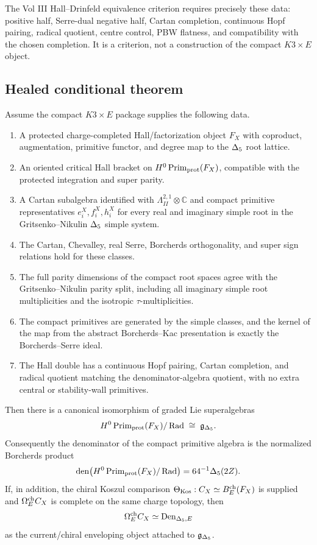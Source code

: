 The Vol III Hall--Drinfeld equivalence criterion requires precisely these
data: positive half, Serre-dual negative half, Cartan completion, continuous
Hopf pairing, radical quotient, centre control, PBW flatness, and
compatibility with the chosen completion.  It is a criterion, not a
construction of the compact \(K3\times E\) object.

\subsection{Healed conditional theorem}

\begin{theorem}
Assume the compact \(K3\times E\) package supplies the following data.
\begin{enumerate}
\item A protected charge-completed Hall/factorization object \(F_X\) with
coproduct, augmentation, primitive functor, and degree map to the
\(\Delta_{5}\) root lattice.
\item An oriented critical Hall bracket on \(H^0\operatorname{Prim}_{\mathrm{prot}}(F_X)\), compatible
with the protected integration and super parity.
\item A Cartan subalgebra identified with
\(\Lambda^{2,1}_{II}\otimes\mathbb C\) and compact primitive representatives
\(e_i^X,f_i^X,h_i^X\) for every real and imaginary simple root in the
Gritsenko--Nikulin \(\Delta_{5}\) simple system.
\item The Cartan, Chevalley, real Serre, Borcherds orthogonality, and super
sign relations hold for these classes.
\item The full parity dimensions of the compact root spaces agree with the
Gritsenko--Nikulin parity split, including all imaginary simple root
multiplicities and the isotropic \(\tau\)-multiplicities.
\item The compact primitives are generated by the simple classes, and the
kernel of the map from the abstract Borcherds--Kac presentation is exactly
the Borcherds--Serre ideal.
\item The Hall double has a continuous Hopf pairing, Cartan completion, and
radical quotient matching the denominator-algebra quotient, with no extra
central or stability-wall primitives.
\end{enumerate}
Then there is a canonical isomorphism of graded Lie superalgebras
\[
   H^0\operatorname{Prim}_{\mathrm{prot}}(F_X)/\operatorname{Rad} \;\cong\; \mathfrak g_{\Delta_{5}} .
\]
Consequently the denominator of the compact primitive algebra is the
normalized Borcherds product
\[
   \operatorname{den}\bigl(H^0\operatorname{Prim}_{\mathrm{prot}}(F_X)/\operatorname{Rad}\bigr)
   =
   64^{-1}\Delta_{5}(2Z).
\]
If, in addition, the chiral Koszul comparison
\(\Theta_{\operatorname{Kos}}:C_X\simeq B^{\operatorname{ch}}_E(F_X)\) is supplied and
\(\Omega^{\operatorname{ch}}_EC_X\) is complete on the same charge topology, then
\[
   \Omega^{\operatorname{ch}}_E C_X\simeq \operatorname{Den}_{\Delta_5,E}
\]
as the current/chiral enveloping object attached to \(\mathfrak g_{\Delta_{5}}\).
\end{theorem}

